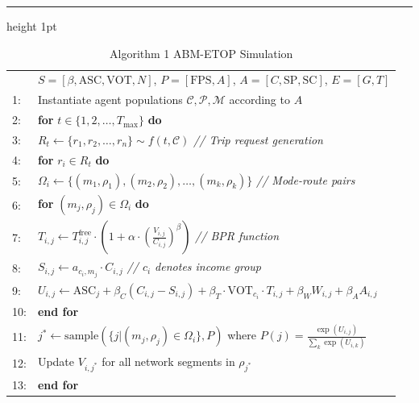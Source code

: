 \documentclass[a4paper,fleqn]{cas-sc}
\begin{document}
\begin{table}[width=\textwidth]
\caption{Algorithm 1 ABM-ETOP Simulation}
\label{alg:abm-etop}
\hrule height 1pt
\vspace{0.5em}
\begin{tabular}{p{}p{}}
& $S = [\beta, \text{ASC}, \text{VOT}, N]$, $P = [\text{FPS}, A]$, $A = [C, \text{SP}, \text{SC}]$, $E = [G, T]$ \\
1: & Instantiate agent populations $\mathcal{C}, \mathcal{P}, \mathcal{M}$ according to $A$ \\
2: & \textbf{for} $t \in \{1,2,\ldots,T_{\text{max}}\}$ \textbf{do} \\
3: & \hspace{1em} $R_t \gets \{r_1, r_2, \ldots, r_n\} \sim f(t, \mathcal{C})$ \textit{// Trip request generation} \\
4: & \hspace{1em} \textbf{for} $r_i \in R_t$ \textbf{do} \\
5: & \hspace{2em} $\Omega_i \gets \{(m_1, \rho_1), (m_2, \rho_2), \ldots, (m_k, \rho_k)\}$ \textit{// Mode-route pairs} \\
6: & \hspace{2em} \textbf{for} $(m_j, \rho_j) \in \Omega_i$ \textbf{do} \\
7: & \hspace{3em} $T_{i,j} \gets T_{i,j}^{\text{free}} \cdot (1 + \alpha \cdot (\frac{V_{i,j}}{C_{i,j}})^{\beta})$ \textit{// BPR function} \\
8: & \hspace{3em} $S_{i,j} \gets a_{c_i,m_j} \cdot C_{i,j}$ \textit{// $c_i$ denotes income group} \\
9: & \hspace{3em} $U_{i,j} \gets \text{ASC}_j + \beta_C(C_{i,j}-S_{i,j}) + \beta_T \cdot \text{VOT}_{c_i} \cdot T_{i,j} + \beta_W W_{i,j} + \beta_A A_{i,j}$ \\
10: & \hspace{2em} \textbf{end for} \\
11: & \hspace{2em} $j^* \gets \text{sample}(\{j | (m_j, \rho_j) \in \Omega_i\}, P)$ where $P(j) = \frac{\exp(U_{i,j})}{\sum_{k} \exp(U_{i,k})}$ \\
12: & \hspace{2em} Update $V_{i,j^*}$ for all network segments in $\rho_{j^*}$ \\
13: & \hspace{1em} \textbf{end for} \\

\end{tabular}
\end{table}
\end{document}
